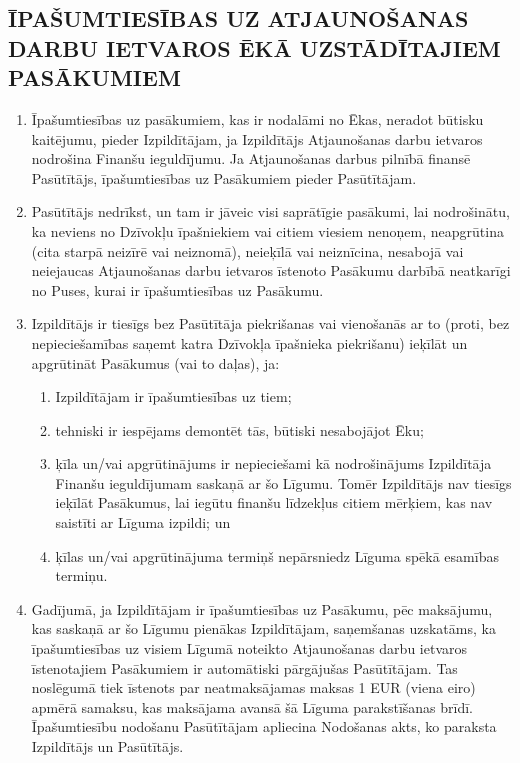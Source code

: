 \begin{multicols}{2}
\subsection{ĪPAŠUMTIESĪBAS UZ ATJAUNOŠANAS DARBU IETVAROS ĒKĀ UZSTĀDĪTAJIEM PASĀKUMIEM}
\begin{enumerate}
	\item Īpašumtiesības uz pasākumiem, kas ir nodalāmi no Ēkas, neradot būtisku kaitējumu, pieder Izpildītājam, ja Izpildītājs Atjaunošanas darbu ietvaros nodrošina Finanšu ieguldījumu. Ja Atjaunošanas darbus pilnībā finansē Pasūtītājs, īpašumtiesības uz Pasākumiem pieder Pasūtītājam.
	\item Pasūtītājs nedrīkst, un tam ir jāveic visi saprātīgie pasākumi, lai nodrošinātu, ka neviens no Dzīvokļu īpašniekiem vai citiem viesiem nenoņem, neapgrūtina (cita starpā neizīrē vai neiznomā), neieķīlā vai neiznīcina, nesabojā vai neiejaucas Atjaunošanas darbu ietvaros īstenoto Pasākumu darbībā neatkarīgi no Puses, kurai ir īpašumtiesības uz Pasākumu.
	\item Izpildītājs ir tiesīgs bez Pasūtītāja piekrišanas vai vienošanās ar to (proti, bez nepieciešamības saņemt katra Dzīvokļa īpašnieka piekrišanu) ieķīlāt un apgrūtināt Pasākumus (vai to daļas), ja:
	\begin{enumerate}
		\item Izpildītājam ir īpašumtiesības uz tiem;
		\item tehniski ir iespējams demontēt tās, būtiski nesabojājot Ēku;
		\item ķīla un/vai apgrūtinājums ir nepieciešami kā nodrošinājums Izpildītāja Finanšu ieguldījumam saskaņā ar šo Līgumu. Tomēr Izpildītājs nav tiesīgs ieķīlāt Pasākumus, lai iegūtu finanšu līdzekļus citiem mērķiem, kas nav saistīti ar Līguma izpildi; un
		\item ķīlas un/vai apgrūtinājuma termiņš nepārsniedz Līguma spēkā esamības termiņu.
	\end{enumerate}
	\item Gadījumā, ja Izpildītājam ir īpašumtiesības uz Pasākumu, pēc maksājumu, kas saskaņā ar šo Līgumu pienākas Izpildītājam, saņemšanas uzskatāms, ka īpašumtiesības uz visiem Līgumā noteikto Atjaunošanas darbu ietvaros īstenotajiem Pasākumiem ir automātiski pārgājušas Pasūtītājam. Tas noslēgumā tiek īstenots par neatmaksājamas maksas 1 EUR (viena eiro) apmērā samaksu, kas maksājama avansā šā Līguma parakstīšanas brīdī. Īpašumtiesību nodošanu Pasūtītājam apliecina Nodošanas akts, ko paraksta Izpildītājs un Pasūtītājs.
\end{enumerate}


\end{multicols}
